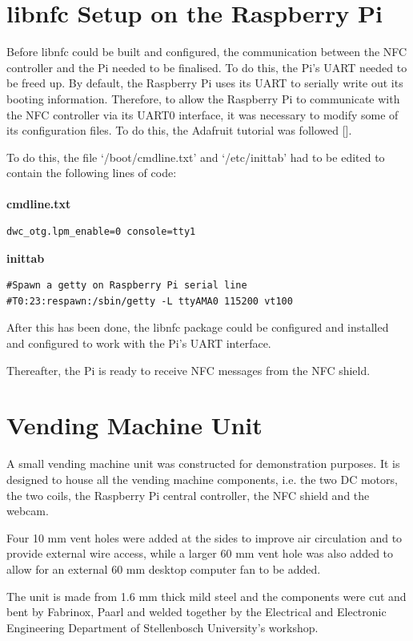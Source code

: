 \section{libnfc Setup on the Raspberry Pi}

Before libnfc could be built and configured, the communication between the NFC
controller and the Pi needed to be finalised. To do this, the Pi's UART needed
to be freed up. By default, the Raspberry Pi uses its UART to serially write out
its booting information. Therefore, to allow the Raspberry Pi to communicate
with the NFC controller via its UART0 interface, it was necessary to modify
some of its configuration files. To do this, the Adafruit tutorial was followed
[\cite{website:adafruit-tutorial}].

To do this, the file `/boot/cmdline.txt' and `/etc/inittab' had to be edited to
contain the following lines of code:\\\\

\textbf{cmdline.txt}
\begin{verbatim}
dwc_otg.lpm_enable=0 console=tty1
\end{verbatim}

\textbf{inittab}
\begin{verbatim}
#Spawn a getty on Raspberry Pi serial line
#T0:23:respawn:/sbin/getty -L ttyAMA0 115200 vt100
\end{verbatim}

After this has been done, the libnfc package could be configured and installed
and configured to work with the Pi's UART interface.

Thereafter, the Pi is ready to receive NFC messages from the
NFC shield.

\section{Vending Machine Unit}

A small vending machine unit was constructed for demonstration purposes. It is
designed to house all the vending machine components, i.e. the two DC motors,
the two coils, the Raspberry Pi central controller, the NFC shield and the
webcam.

Four 10 mm vent holes were added at the sides to improve air circulation
and to provide external wire access, while a larger 60 mm vent hole was also
added to allow for an external 60 mm desktop computer fan to be added. 

The unit is made from 1.6 mm thick mild steel and the components were cut and
bent by Fabrinox, Paarl and welded together by the Electrical and Electronic
Engineering Department of Stellenbosch University's workshop.

